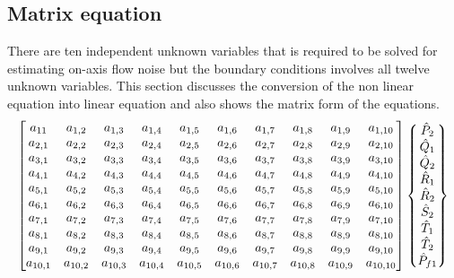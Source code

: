 \documentclass[10pt]{asme2ej}
\begin{document}
\begin{landscape}
\section{Matrix equation}\label{matrix form 3d appendix}
There are ten independent unknown variables that is required to be solved for estimating on-axis flow noise but the boundary conditions involves all twelve unknown variables. This section discusses the conversion of the non linear equation into linear equation and also shows the matrix form of the equations.
\[
\begin{bmatrix}
    a_{11} & a_{1,2} & a_{1,3} & a_{1,4} & a_{1,5} & a_{1,6} & a_{1,7} & a_{1,8} & a_{1,9} & a_{1,10}\\
    a_{2,1} & a_{2,2} & a_{2,3} & a_{2,4} & a_{2,5} & a_{2,6} & a_{2,7} & a_{2,8} & a_{2,9} & a_{2,10}\\
    a_{3,1} & a_{3,2} & a_{3,3} & a_{3,4} & a_{3,5} & a_{3,6} & a_{3,7} & a_{3,8} & a_{3,9} & a_{3,10}\\
    a_{4,1} & a_{4,2} & a_{4,3} & a_{4,4} & a_{4,5} & a_{4,6} & a_{4,7} & a_{4,8} & a_{4,9} & a_{4,10}\\
    a_{5,1} & a_{5,2} & a_{5,3} & a_{5,4} & a_{5,5} & a_{5,6} & a_{5,7} & a_{5,8} & a_{5,9} & a_{5,10}\\
    a_{6,1} & a_{6,2} & a_{6,3} & a_{6,4} & a_{6,5} & a_{6,6} & a_{6,7} & a_{6,8} & a_{6,9} & a_{6,10}\\
    a_{7,1} & a_{7,2} & a_{7,3} & a_{7,4} & a_{7,5} & a_{7,6} & a_{7,7} & a_{7,8} & a_{7,9} & a_{7,10}\\
    a_{8,1} & a_{8,2} & a_{8,3} & a_{8,4} & a_{8,5} & a_{8,6} & a_{8,7} & a_{8,8} & a_{8,9} & a_{8,10}\\
    a_{9,1} & a_{9,2} & a_{9,3} & a_{9,4} & a_{9,5} & a_{9,6} & a_{9,7} & a_{9,8} & a_{9,9} & a_{9,10}\\
    a_{10,1} & a_{10,2} & a_{10,3} & a_{10,4} & a_{10,5} & a_{10,6} & a_{10,7} & a_{10,8} & a_{10,9} & a_{10,10}
\end{bmatrix}
\begin{Bmatrix}
    \Hat{P}_2\\
    \Hat{Q}_1\\
    \Hat{Q}_2\\
    \Hat{R}_1\\
    \Hat{R}_2\\
    \Hat{S}_2\\
    \Hat{T}_1\\
    \Hat{T}_2\\
    \Hat{P}_{f1}\\

\end{Bmatrix}\]
\end{landscape}
\end{document}
